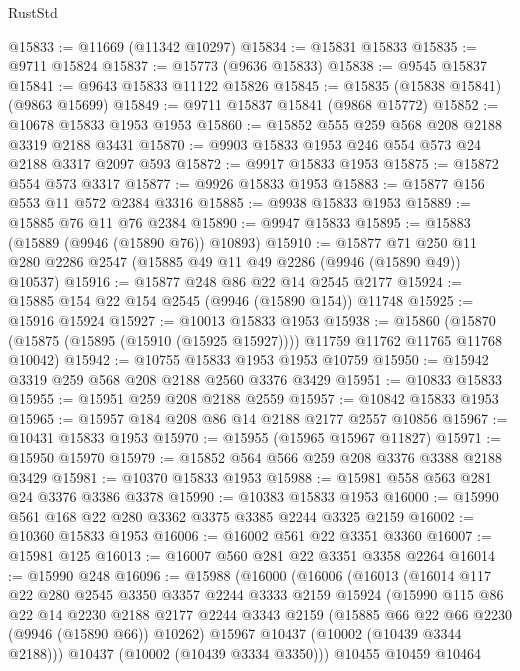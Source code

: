 \begin{lexlean}{RustStd}
\begin{coremodule}
@15833 := @11669 (@11342 @10297)
@15834 := @15831 @15833
@15835 := @9711 @15824
@15837 := @15773 (@9636 @15833)
@15838 := @9545 @15837
@15841 := @9643 @15833 @11122 @15826
@15845 := @15835 (@15838 @15841) (@9863 @15699)
@15849 := @9711 @15837 @15841 (@9868 @15772)
@15852 := @10678 @15833 @1953 @1953
@15860 := @15852 @555 @259 @568 @208 @2188 @3319 @2188 @3431
@15870 := @9903 @15833 @1953 @246 @554 @573 @24 @2188 @3317 @2097 @593
@15872 := @9917 @15833 @1953
@15875 := @15872 @554 @573 @3317
@15877 := @9926 @15833 @1953
@15883 := @15877 @156 @553 @11 @572 @2384 @3316
@15885 := @9938 @15833 @1953
@15889 := @15885 @76 @11 @76 @2384
@15890 := @9947 @15833
@15895 := @15883 (@15889 (@9946 (@15890 @76)) @10893)
@15910 := @15877
    @71
    @250
    @11
    @280
    @2286
    @2547
    (@15885 @49 @11 @49 @2286 (@9946 (@15890 @49)) @10537)
@15916 := @15877 @248 @86 @22 @14 @2545 @2177
@15924 := @15885 @154 @22 @154 @2545 (@9946 (@15890 @154)) @11748
@15925 := @15916 @15924
@15927 := @10013 @15833 @1953
@15938 := @15860
    (@15870 (@15875 (@15895 (@15910 (@15925 @15927)))) @11759 @11762 @11765 @11768 @10042)
@15942 := @10755 @15833 @1953 @1953 @10759
@15950 := @15942 @3319 @259 @568 @208 @2188 @2560 @3376 @3429
@15951 := @10833 @15833
@15955 := @15951 @259 @208 @2188 @2559
@15957 := @10842 @15833 @1953
@15965 := @15957 @184 @208 @86 @14 @2188 @2177 @2557 @10856
@15967 := @10431 @15833 @1953
@15970 := @15955 (@15965 @15967 @11827)
@15971 := @15950 @15970
@15979 := @15852 @564 @566 @259 @208 @3376 @3388 @2188 @3429
@15981 := @10370 @15833 @1953
@15988 := @15981 @558 @563 @281 @24 @3376 @3386 @3378
@15990 := @10383 @15833 @1953
@16000 := @15990 @561 @168 @22 @280 @3362 @3375 @3385 @2244 @3325 @2159
@16002 := @10360 @15833 @1953
@16006 := @16002 @561 @22 @3351 @3360
@16007 := @15981 @125
@16013 := @16007 @560 @281 @22 @3351 @3358 @2264
@16014 := @15990 @248
@16096 := @15988
    (@16000
      (@16006
        (@16013
          (@16014
            @117
            @22
            @280
            @2545
            @3350
            @3357
            @2244
            @3333
            @2159
            @15924
            (@15990
              @115
              @86
              @22
              @14
              @2230
              @2188
              @2177
              @2244
              @3343
              @2159
              (@15885 @66 @22 @66 @2230 (@9946 (@15890 @66)) @10262)
              @15967
              @10437
              (@10002 (@10439 @3344 @2188)))
            @10437
            (@10002 (@10439 @3334 @3350)))
          @10455
          @10459
          @10464

\end{coremodule}
\end{lexlean}
